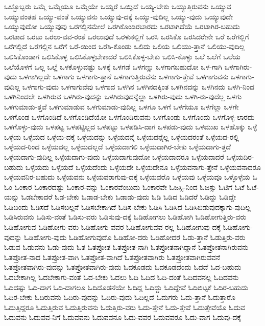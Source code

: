 {ಒಬ್ಬೊಬ್ಬರು
ಒಮ್ಮೆ
ಒಮ್ಮೆಯೂ
ಒಮ್ಮೆಯೇ
ಒಯ್ದರೆ
ಒಯ್ದಿದೆ
ಒಯ್ಯ-ಬೇಕು
ಒಯ್ಯುತ್ತಿರುವನು
ಒಯ್ಯುವ
ಒಯ್ಯುವಂತಹ
ಒಯ್ಯು-ವಂತೆ
ಒಯ್ಯುವನು
ಒಯ್ಯುವು-ದಕ್ಕೆ
ಒಯ್ಯು-ವುದಿಲ್ಲ
ಒಯ್ಯು-ವುದು
ಒಯ್ಯುವುದೇ
ಒಯ್ಯುವುದೋ
ಒಯ್ಯುವುವು
ಒರಗಲ್ಲಿನಮೇಲೆ
ಒರಗಿಕೊಂಡಿರಬಾರದು
ಒರಟಾಗಿದೆಯೆ
ಒರಟಾಗಿರ-ಬಹುದು
ಒರಟಾದ
ಒರಟು
ಒರಲು-ವವ-ರಂತೆ
ಒರಲುವುದೆ
ಒರಳುಕಲ್ಲಿಗೆ
ಒರಸಿ
ಒರಸಿಕೊ
ಒರಸಿದರೇನೇ
ಒರೆ
ಒರೆಗಲ್ಲಿಗೆ
ಒರೆಗಲ್ಲಿದೆ
ಒರೆಗಲ್ಲಿನ
ಒರೆಗೆ
ಒರೆ-ಯಿಂದ
ಒರೆಸಿ-ಕೊಂಡು
ಒಲಿದು
ಒಲಿಯ
ಒಲಿಯು-ತ್ತಾನೆ
ಒಲಿಯು-ವುದಿಲ್ಲ
ಒಲಿಸಿಕೊಂಡಾಗ
ಒಲಿಸಿಕೊಳ್ಳ
ಒಲಿಸಿಕೊಳ್ಳಬೇಕಾದರೆ
ಒಲಿಸಿಕೊಳ್ಳ-ಬೇಕು
ಒಲಿಸಿ-ಕೊಳ್ಳು
ಒಲೆ
ಒಲೆಗೆ
ಒಲೆಯ
ಒಲೆಯೊಳಗೆ
ಒಲ್ಲ
ಒಲ್ಲೆ
ಒಳಕೊಳ್ಳುವಷ್ಟು
ಒಳಕ್ಕೆ
ಒಳಗಡೆ
ಒಳಗಣ್ಣು
ಒಳಗಾಗಬಹುದೋ
ಒಳ-ಗಾಗಿ
ಒಳಗಾಗಿರು-ವುದು
ಒಳಗಾಗಿಲ್ಲದೇ
ಒಳಗಾಗು
ಒಳಗಾಗು-ತ್ತಾನೆ
ಒಳಗಾಗುತ್ತಿರುವೆನು
ಒಳಗಾಗು-ತ್ತೇವೆ
ಒಳಗಾಗುವನು
ಒಳಗಾಗು-ವುದಿಲ್ಲ
ಒಳಗಾಗು-ವುದು
ಒಳಗಾಗುವೆವು
ಒಳಗಾದ
ಒಳಗಿನ
ಒಳಗಿನದಕ್ಕಿಂತ
ಒಳಗಿನದನ್ನು
ಒಳಗಿನದು
ಒಳಗಿ-ನಿಂದ
ಒಳಗಿನಿಂದಲೇ
ಒಳಗಿರುವ
ಒಳಗಿರು-ವುದನ್ನು
ಒಳಗಿರುವುದನ್ನೆಲ್ಲಾ
ಒಳಗಿರು-ವುದು
ಒಳಗಿ-ರು-ವುದೆಲ್ಲ
ಒಳಗು
ಒಳಗುಮಾಡು-ತ್ತವೆ
ಒಳಗುಮಾಡುವ
ಒಳಗುಮಾಡು-ವುದಿಲ್ಲ
ಒಳಗೂ
ಒಳಗೆ
ಒಳಗೆಯೂ
ಒಳಗೆಲ್ಲಾ
ಒಳಗೇ
ಒಳಗೊಂಡ
ಒಳಗೊಂಡಿದೆ
ಒಳಗೊಂಡಿದೆಯೋ
ಒಳಗೊಂಡಿರುವನು
ಒಳಗೊಂಡು
ಒಳಗೊಂದು
ಒಳಗೊಳ್ಳ-ಲಾರದು
ಒಳಗೊಳ್ಳು-ವುದು
ಒಳಪಟ್ಟ
ಒಳಪಟ್ಟಿಲ್ಲದ
ಒಳಪಟ್ಟು
ಒಳಪಡಿಸಿ-ದಾಗ
ಒಳಪಡು-ವುದು
ಒಳಮುಖ
ಒಳಹೊಕ್ಕು
ಒಳ್ಳೆ
ಒಳ್ಳೆಯ
ಒಳ್ಳೆಯದ
ಒಳ್ಳೆಯ-ದಕ್ಕೆ
ಒಳ್ಳೆಯದನ್ನು
ಒಳ್ಳೆಯದನ್ನೆ
ಒಳ್ಳೆಯದನ್ನೆಲ್ಲ
ಒಳ್ಳೆಯದರಂತೆ
ಒಳ್ಳೆಯದ-ರಲ್ಲಿ
ಒಳ್ಳೆಯದ-ರಿಂದ
ಒಳ್ಳೆಯದಲ್ಲ
ಒಳ್ಳೆಯದಲ್ಲದೆ
ಒಳ್ಳೆಯದಾಗಲಿ
ಒಳ್ಳೆಯದಾಗಿರ-ಬೇಕು
ಒಳ್ಳೆಯದಾಗು-ತ್ತದೆ
ಒಳ್ಳೆಯದಾಗು-ವುದಿಲ್ಲ
ಒಳ್ಳೆಯದಾಗು-ವುದು
ಒಳ್ಳೆಯದಾಗುವುದೋ
ಒಳ್ಳೆಯದಾದರೂ
ಒಳ್ಳೆಯದಾದರೆ
ಒಳ್ಳೆಯದಿರ-ಬಹುದು
ಒಳ್ಳೆಯದು
ಒಳ್ಳೆಯದೆ
ಒಳ್ಳೆಯದೆಂದು
ಒಳ್ಳೆಯದೇ
ಒಳ್ಳೆಯದೇನೂ
ಒಳ್ಳೆಯವನಾಗು-ತ್ತೇನೆ
ಒಳ್ಳೆಯವನಾದರೂ
ಒಳ್ಳೆಯವನಿರ-ಬಹುದು
ಒಳ್ಳೆಯವನು
ಒಳ್ಳೆಯವರಾಗುವು-ದಕ್ಕೆ
ಒಳ್ಳೆಯವರೊ
ಒಳ್ಳೆಯವು
ಒಳ್ಳೆಯವೂ
ಒಳ್ಳೊಳ್ಳೆಯ
ಓ
ಓಂ
ಓಂಕಾರ
ಓಂಕಾರದಷ್ಟು
ಓಂಕಾರ-ವನ್ನು
ಓಂಕಾರವೆಂಬುದು
ಓಂಕಾರವೇ
ಓಜಸ್ಸಿ-ನಿಂದ
ಓಜಸ್ಸು
ಓಟಿಗೆ
ಓಟೆ
ಓಟೆ-ಯನ್ನು
ಓಡಬೇಕಾದರೆ
ಓಡ-ಬೇಕು
ಓಡಾಡ-ಬೇಕು
ಓಡಾಡು-ವುದು
ಓಡಿ
ಓಡಿದ
ಓಡಿದರೆ
ಓಡಿದ್ದು
ಓಡಿದ್ದೇ
ಓಡಿಬಂದು
ಓಡಿಸದೆ
ಓಡಿಸಬಲ್ಲನೆ
ಓಡಿಸಬೇಕಾಗಿದೆ
ಓಡಿಸ-ಬೇಕು
ಓಡಿಸಿ
ಓಡಿಸಿದ
ಓಡಿಸಿಬಿಡುವುದಕ್ಕಾಗು-ವುದಿಲ್ಲ
ಓಡಿಸಿರುವನು
ಓಡಿಸು-ವಂತೆ
ಓಡಿಸು-ವರು
ಓಡಿಸುವು-ದಕ್ಕೆ
ಓಡಿಹೋಗಲು
ಓಡಿಹೋಗಿ
ಓಡಿಹೋಗುತ್ತಿರು-ವರು
ಓಡಿಹೋಗುವ
ಓಡಿಹೋಗು-ವರು
ಓಡಿಹೋಗು-ವವರ
ಓಡಿಹೋಗುವವ-ರಲ್ಲ
ಓಡಿಹೋಗುವು-ದಕ್ಕೆ
ಓಡಿಹೋಗು-ವುದನ್ನು
ಓಡಿಹೋಗು-ವುದು
ಓಡಿಹೋಗುವುದೊ
ಓಡಿಹೋ-ದರು
ಓಡಿಹೋದರೆ
ಓಡು-ತ್ತಾನೆ
ಓಡುತ್ತಿರು-ವರು
ಓಡುವ
ಓಡುವನು
ಓಡು-ವುದು
ಓತ
ಓತಪ್ರೋತ
ಓತಪ್ರೋತ-ನಾಗಿ
ಓತಪ್ರೋತನಾಗಿದ್ದಾನೆ
ಓತಪ್ರೋತನಾಗಿರುವನು
ಓತಪ್ರೋತ-ನಾದ
ಓತಪ್ರೋತ-ವಾಗಿ
ಓತಪ್ರೋತ-ವಾಗಿದೆ
ಓತಪ್ರೋತವಾಗಿರು
ಓತಪ್ರೋತವಾಗಿರುವವನೆ
ಓತಪ್ರೋತವಾಗಿರು-ವುದನ್ನು
ಓತಪ್ರೋತವಾಗಿರು-ವುದು
ಓದಕೂಡದು
ಓದಕೂಡದೆಂದು
ಓದದೆ
ಓದ-ಬಹುದು
ಓದಬೇಕಾಗಿಲ್ಲ
ಓದಬೇಕಾಗು-ವಂತೆ
ಓದ-ಬೇಕು
ಓದಲು
ಓದಿ
ಓದಿದ
ಓದಿ-ದಂತೆ
ಓದಿದವನಲ್ಲ
ಓದಿದವನು
ಓದಿದಷ್ಟು
ಓದಿ-ದಾಗ
ಓದಿ-ದಾಗಲೂ
ಓದಿದೊಡನೆಯೇ
ಓದಿದ್ದ
ಓದಿದ್ದು
ಓದಿದ್ದೇವೆ
ಓದಿಬಿಟ್ಟಕೆ
ಓದಿರ-ಬಹುದು
ಓದಿರ-ಬೇಕು
ಓದಿರುವನು
ಓದಿರು-ವುದನ್ನು
ಓದಿರು-ವುದು
ಓದಿಲ್ಲದೆ
ಓದುಗರು
ಓದು-ತ್ತಾನೆ
ಓದುತ್ತಾರೊ
ಓದುತ್ತಿದ್ದರೂ
ಓದುತ್ತಿರುವ
ಓದುತ್ತಿರುವನು
ಓದುತ್ತಿರು-ವರು
ಓದು-ತ್ತೇನೆ
ಓದು-ತ್ತೇವೆ
ಓದುತ್ತೇವೆಯೊ
ಓದುವ
ಓದುವನು
ಓದುವವ-ನಿಗೆ
ಓದುವವನು
ಓದುವವನೂ
ಓದು-ವವರ
ಓದುವವರೂ
ಓದು-ವಾಗ
ಓದುವು-ದಕ್ಕೆ
}
